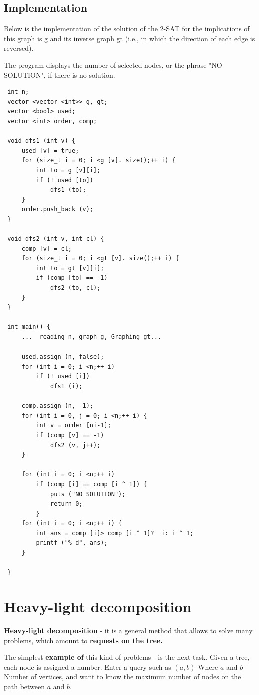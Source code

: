 \subsection{ Implementation }
Below is the implementation of the solution of the 2-SAT for the implications of this graph is g and its inverse graph gt (i.e., in which the direction of each edge is reversed).

The program displays the number of selected nodes, or the phrase "NO SOLUTION", if there is no solution.

\begin{verbatim}
 int n;
 vector <vector <int>> g, gt;
 vector <bool> used;
 vector <int> order, comp;

 void dfs1 (int v) {
     used [v] = true;
     for (size_t i = 0; i <g [v]. size();++ i) {
         int to = g [v][i];
         if (! used [to])
             dfs1 (to);
     }
     order.push_back (v);
 }

 void dfs2 (int v, int cl) {
     comp [v] = cl;
     for (size_t i = 0; i <gt [v]. size();++ i) {
         int to = gt [v][i];
         if (comp [to] == -1)
             dfs2 (to, cl);
     }
 }

 int main() {
     ...  reading n, graph g, Graphing gt...

     used.assign (n, false);
     for (int i = 0; i <n;++ i)
         if (! used [i])
             dfs1 (i);

     comp.assign (n, -1);
     for (int i = 0, j = 0; i <n;++ i) {
         int v = order [ni-1];
         if (comp [v] == -1)
             dfs2 (v, j++);
     }

     for (int i = 0; i <n;++ i)
         if (comp [i] == comp [i ^ 1]) {
             puts ("NO SOLUTION");
             return 0;
         }
     for (int i = 0; i <n;++ i) {
         int ans = comp [i]> comp [i ^ 1]?  i: i ^ 1;
         printf ("% d", ans);
     }

 } 
\end{verbatim}
\section{ Heavy-light decomposition }
\textbf{Heavy-light decomposition} - it is a general method that allows to solve many problems, which amount to \textbf{requests on the tree.}

The simplest \textbf{example of} this kind of problems - is the next task. Given a tree, each node is assigned a number. Enter a query such as $(a, b)$ Where $a$ and $b$ - Number of vertices, and want to know the maximum number of nodes on the path between $a$ and $b$.

